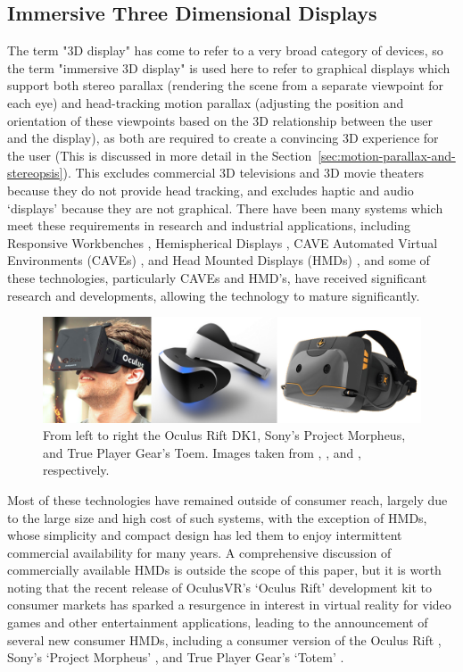 \subsection{Immersive Three Dimensional Displays}
\label{sec:3d-display}
	
	The term "3D display" has come to refer to a very broad category of devices, so the term "immersive 3D display" is used here to refer to graphical displays which support both stereo parallax (rendering the scene from a separate viewpoint for each eye) and head-tracking motion parallax (adjusting the position and orientation of these viewpoints based on the 3D relationship between the user and the display), as both are required to create a convincing 3D experience for the user (This is discussed in more detail in the Section~\ref{sec:motion-parallax-and-stereopsis}). This excludes commercial 3D televisions and 3D movie theaters because they do not provide head tracking, and excludes haptic and audio ‘displays' because they are not graphical. There have been many systems which meet these requirements in research and industrial applications, including Responsive Workbenches \cite{responsive-workbench}, Hemispherical Displays \cite{hemi-display}, CAVE Automated Virtual Environments (CAVEs) \cite{cave}, and Head Mounted Displays (HMDs) \cite{sutherland-hmd}, and some of these technologies, particularly CAVEs and HMD's, have received significant research and developments, allowing the technology to mature significantly.
	
\begin{figure}[ht!]
\centering
\includegraphics[width=1.0\textwidth]{images/hmds.png}
\caption{From left to right the Oculus Rift DK1, Sony's Project Morpheus, and True Player Gear's Toem. Images taken from \protect\cite{oculus-rift}, \protect\cite{project-morpheus}, and \protect\cite{true-player-gear}, respectively.}
\label{fig:hmds}
\end{figure}
 
Most of these technologies have remained outside of consumer reach, largely due to the large size and high cost of such systems, with the exception of HMDs, whose simplicity and compact design has led them to enjoy intermittent commercial availability for many years. A comprehensive discussion of commercially available HMDs is outside the scope of this paper, but it is worth noting that the recent release of OculusVR's ‘Oculus Rift' development kit to consumer markets has sparked a resurgence in interest in virtual reality for video games and other entertainment applications, leading to the announcement of several new consumer HMDs, including a consumer version of the Oculus Rift \cite{oculus-rift}, Sony's ‘Project Morpheus' \cite{project-morpheus}, and True Player Gear's ‘Totem' \cite{true-player-gear}. 

